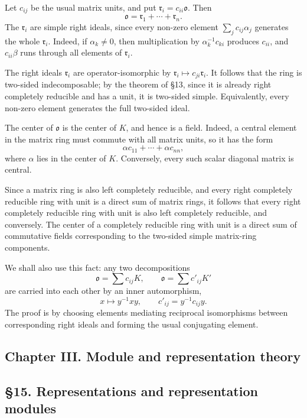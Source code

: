 \documentclass[11pt]{article}
\begin{document}
Let \(c_{ij}\) be the usual matrix units, and put
\(\mathfrak r_i=c_{ii}\mathfrak{o}\). Then \[
  \mathfrak{o}=\mathfrak r_1+\cdots+\mathfrak r_n.
\] The \(\mathfrak r_i\) are simple right ideals, since every non-zero
element \(\sum_j c_{ij}\alpha_j\) generates the whole \(\mathfrak r_i\).
Indeed, if \(\alpha_k\ne0\), then multiplication by
\(\alpha_k^{-1}c_{ki}\) produces \(c_{ii}\), and \(c_{ii}\beta\) runs
through all elements of \(\mathfrak r_i\).

The right ideals \(\mathfrak r_i\) are operator-isomorphic by
\(\mathfrak r_i\mapsto c_{ji}\mathfrak r_i\). It follows that the ring
is two-sided indecomposable; by the theorem of §13, since it is already
right completely reducible and has a unit, it is two-sided simple.
Equivalently, every non-zero element generates the full two-sided ideal.

The center of \(\mathfrak{o}\) is the center of \(K\), and hence is a
field. Indeed, a central element in the matrix ring must commute with
all matrix units, so it has the form \[
  \alpha c_{11}+\cdots+\alpha c_{nn},
\] where \(\alpha\) lies in the center of \(K\). Conversely, every such
scalar diagonal matrix is central.

Since a matrix ring is also left completely reducible, and every right
completely reducible ring with unit is a direct sum of matrix rings, it
follows that every right completely reducible ring with unit is also
left completely reducible, and conversely. The center of a completely
reducible ring with unit is a direct sum of commutative fields
corresponding to the two-sided simple matrix-ring components.

We shall also use this fact: any two decompositions \[
  \mathfrak{o}=\sum c_{ij}K,
  \qquad
  \mathfrak{o}=\sum c'_{ij}K'
\] are carried into each other by an inner automorphism, \[
  x\mapsto y^{-1}xy,
  \qquad
  c'_{ij}=y^{-1}c_{ij}y.
\] The proof is by choosing elements mediating reciprocal isomorphisms
between corresponding right ideals and forming the usual conjugating
element.

\subsection{Chapter III. Module and representation
theory}\label{chapter-iii.-module-and-representation-theory}

\subsection{§15. Representations and representation
modules}\label{representations-and-representation-modules}
\end{document}
